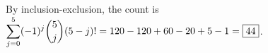 By inclusion-exclusion, the count is $\displaystyle\sum_{j=0}^5(-1)^j\dbinom5j(5-j)!=120-120+60-20+5-1=\boxed{44}$.

